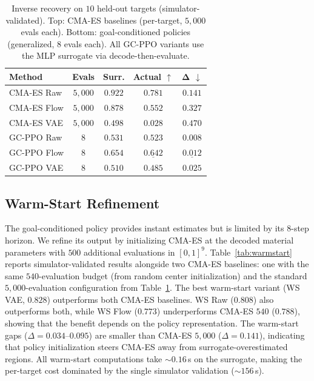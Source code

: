 \begin{table}[t]
\centering
\caption{Inverse recovery on $10$ held-out targets (simulator-validated). Top: CMA-ES baselines (per-target, $5{,}000$ evals each). Bottom: goal-conditioned policies (generalized, $8$ evals each). All GC-PPO variants use the MLP surrogate via decode-then-evaluate.}
\label{tab:gc}
\small
\begin{tabular}{lcccc}
\toprule
\textbf{Method} & \textbf{Evals} & \textbf{Surr.} & \textbf{Actual} $\uparrow$ & $\boldsymbol{\Delta}$ $\downarrow$ \\
\midrule
CMA-ES Raw & $5{,}000$ & $0.922$ & $\mathbf{0.781}$ & $0.141$ \\
CMA-ES Flow & $5{,}000$ & $0.878$ & $0.552$ & $0.327$ \\
CMA-ES VAE & $5{,}000$ & $0.498$ & $0.028$ & $0.470$ \\
\midrule
GC-PPO Raw & $8$ & $0.531$ & $0.523$ & $\mathbf{0.008}$ \\
GC-PPO Flow & $8$ & $0.654$ & $\underline{0.642}$ & $\underline{0.012}$ \\
GC-PPO VAE & $8$ & $0.510$ & $0.485$ & $0.025$ \\
\bottomrule
\end{tabular}
\end{table}

\subsection{Warm-Start Refinement}
\label{sec:warmstart_exp}

The goal-conditioned policy provides instant estimates but is limited by its $8$-step horizon. We refine its output by initializing CMA-ES at the decoded material parameters with $500$ additional evaluations in $[0,1]^9$. Table~\ref{tab:warmstart} reports simulator-validated results alongside two CMA-ES baselines: one with the same $540$-evaluation budget (from random center initialization) and the standard $5{,}000$-evaluation configuration from Table~\ref{tab:gc}. The best warm-start variant (WS VAE, $0.828$) outperforms both CMA-ES baselines. WS Raw ($0.808$) also outperforms both, while WS Flow ($0.773$) underperforms CMA-ES $540$ ($0.788$), showing that the benefit depends on the policy representation. The warm-start gaps ($\Delta{=}0.034$--$0.095$) are smaller than CMA-ES $5{,}000$ ($\Delta{=}0.141$), indicating that policy initialization steers CMA-ES away from surrogate-overestimated regions. All warm-start computations take ${\sim}0.16$\,s on the surrogate, making the per-target cost dominated by the single simulator validation (${\sim}156$\,s).

